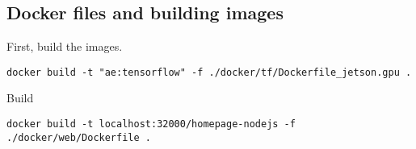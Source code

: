 \subsection{Docker files and building images}

First, build the images.

\begin{verbatim}
docker build -t "ae:tensorflow" -f ./docker/tf/Dockerfile_jetson.gpu .
\end{verbatim}

Build
\begin{verbatim}
docker build -t localhost:32000/homepage-nodejs -f ./docker/web/Dockerfile .
\end{verbatim}
